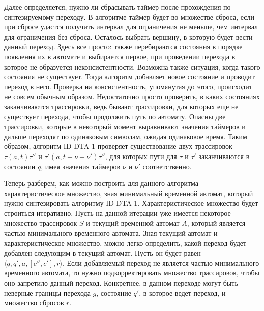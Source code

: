 \documentclass[times,specification,annotation]{itmo-student-thesis}
\begin{document}
Далее определяется, нужно ли 
сбрасывать таймер после прохождения по синтезируемому переходу. В алгоритме таймер будет во множестве сброса, если при сбросе удастся получить интервал для ограничения не меньше, чем
интервал для ограничения без сброса. Осталось выбрать вершину, в которую будет вести данный переход. Здесь все просто: также перебираются состояния в порядке появления их в автомате и
выбирается первое, при проведении перехода в которое не образуется неконсистентности. Возможна также ситуация, когда такого состояния не существует. Тогда алгоритм добавляет новое состояние и проводит 
переход в него. Проверка на консистентность, упомянутая до этого, происходит не совсем обычным образом. Недостаточно просто проверить, в каких состояниях заканчиваются трассировки, ведь бывают
трассировки, для которых еще не существует перехода, чтобы продолжить путь по автомату. Опасны две трассировки, которые в некоторый момент выравнивают значения таймеров и дальше переходят
по одинаковым символам, ожидая одинаковое время. Таким образом, алгоритм ID-DTA-1 проверяет существование двух трассировок $\tau(a, t)\tau''$ и $\tau'(a, t + \nu - \nu')\tau''$, для
которых пути для $\tau$ и $\tau'$ заканчиваются в состоянии $q$, имея значения таймеров $\nu$ и $\nu'$ соответственно. 

Теперь разберем, как можно построить для данного алгоритма характеристическое множество, зная минимальный временной автомат, который нужно синтезировать алгоритму ID-DTA-1. Характеристическое
множество будет строиться итеративно. Пусть на данной итерации уже имеется некоторое множество трассировок $S$ и текущий временной автомат $A$, который является частью минимального временного
автомата. Зная текущий автомат и характеристическое множество, можно легко определить, какой переход будет добавлен следующим в текущий автомат. 
Пусть он будет равен $\langle q, q', a, \left[ c'', c' \right], r \rangle$.  Если добавляемый переход не является частью минимального временного автомата, 
то нужно подкорректировать множество трассировок, чтобы оно запретило данный переход. 
Конкретнее, в данном переходе могут быть неверные границы перехода $g$, состояние $q'$, в которое ведет переход, и множество сбросов $r$.
\end{document}
